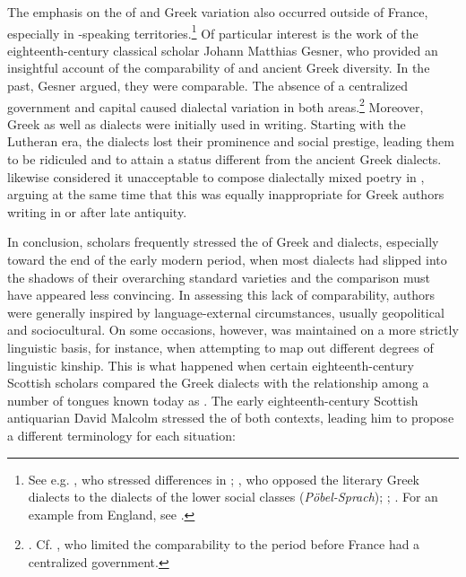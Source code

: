 The emphasis on the  of  and Greek variation also occurred outside of France, especially in -speaking territories.\footnote{See e.g. \citet[b.2\textsc{\textsuperscript{v}}\textsc{–}b.3\textsc{\textsuperscript{r}}]{Nibbe1725}, who stressed differences in ; \citet[1131--1132]{[frisch]1730}, who opposed the literary Greek dialects to the  dialects of the lower social classes (\textit{Pöbel-Sprach}); \citet[6--8]{[frederick1780}; \citet[203--204]{Ries1786}. For an example from England, see \citet[13--14]{Bayly1756}.} Of particular interest is the work of the eighteenth-century  classical scholar Johann Matthias Gesner, who provided an insightful account of the comparability of  and ancient Greek diversity. In the past, Gesner argued, they were comparable. The absence of a centralized government and capital caused dialectal variation in both areas.\footnote{\citet[160--161]{Gesner1774}. Cf. \citet[lxviii]{Court1778}, who limited the comparability to the period before France had a centralized government.} Moreover, Greek as well as  dialects were initially used in writing. Starting with the Lutheran era, the  dialects lost their prominence and social prestige, leading them to be ridiculed and to attain a status different from the ancient Greek dialects. \citet[162]{Gesner1774} likewise considered it unacceptable to compose dialectally mixed poetry in , arguing at the same time that this was equally inappropriate for Greek authors writing in or after late antiquity.

In conclusion, scholars frequently stressed the  of Greek and  dialects, especially toward the end of the early modern period, when most  dialects had slipped into the shadows of their overarching standard varieties and the comparison must have appeared less convincing. In assessing this lack of comparability, authors were generally inspired by language-external circumstances, usually geopolitical and sociocultural. On some occasions, however,  was maintained on a more strictly linguistic basis, for instance, when attempting to map out different degrees of linguistic kinship. This is what happened when certain eighteenth-century Scottish scholars compared the Greek dialects with the relationship among a number of tongues known today as . The early eighteenth-century Scottish antiquarian David Malcolm stressed the  of both contexts, leading him to propose a different terminology for each situation:

